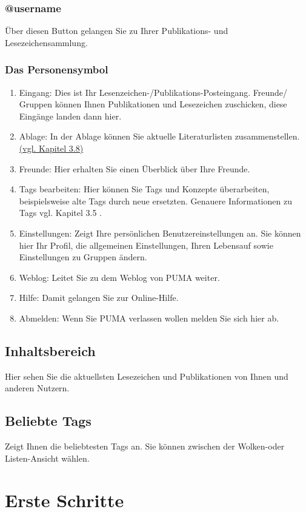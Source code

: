 \documentclass[a4paper,11pt,twoside]{scrbook}
\begin{document}
\subsubsection{@username}
Über diesen Button gelangen Sie zu Ihrer Publikations- und Lesezeichensammlung. 
\subsubsection{Das Personensymbol}
\begin{enumerate}
    \item Eingang: Dies ist Ihr Lesenzeichen-/Publikations-Posteingang. Freunde/ Gruppen können Ihnen Publikationen und Lesezeichen zuschicken, diese Eingänge landen dann hier.
    \item Ablage: In der Ablage können Sie aktuelle Literaturlisten zusammenstellen. \hyperlink{Ablage}{(vgl. Kapitel 3.8)}
    \item Freunde: Hier erhalten Sie einen Überblick über Ihre Freunde. 
    \item Tags bearbeiten: Hier können Sie Tags und Konzepte überarbeiten, beispielsweise alte Tags durch neue ersetzten. Genauere Informationen zu Tags vgl. Kapitel 3.5 .
    \item Einstellungen: Zeigt Ihre persönlichen Benutzereinstellungen an. Sie können hier Ihr Profil, die allgemeinen Einstellungen, Ihren Lebensauf sowie Einstellungen zu Gruppen ändern.
    \item Weblog: Leitet Sie zu dem Weblog von PUMA weiter.
    \item Hilfe: Damit gelangen Sie zur Online-Hilfe.
    \item Abmelden: Wenn Sie PUMA verlassen wollen melden Sie sich hier ab. 
\end{enumerate}
\subsection{Inhaltsbereich}
Hier sehen Sie die aktuellsten Lesezeichen und Publikationen von Ihnen und anderen Nutzern. 
\subsection{Beliebte Tags}
Zeigt Ihnen die beliebtesten Tags an. Sie können zwischen der Wolken-oder Listen-Ansicht wählen.
\newpage
\section{Erste Schritte}
\end{document}
